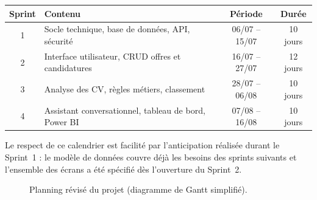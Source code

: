 \documentclass[11pt,a4paper]{article}
\begin{document}
\begin{center}
\begin{tabular}{clcc}
  \toprule
  \textbf{Sprint} & \textbf{Contenu} & \textbf{Période} & \textbf{Durée} \\
  \midrule
  1 & Socle technique, base de données, API, sécurité & 06/07 -- 15/07 & 10 jours \\
  2 & Interface utilisateur, CRUD offres et candidatures & 16/07 -- 27/07 & 12 jours \\
  3 & Analyse des CV, règles métiers, classement & 28/07 -- 06/08 & 10 jours \\
  4 & Assistant conversationnel, tableau de bord, Power BI & 07/08 -- 16/08 & 10 jours \\
  \bottomrule
\end{tabular}
\end{center}

\vspace{2mm}
\noindent Le respect de ce calendrier est facilité par l'anticipation réalisée durant le Sprint~1 : le modèle de données couvre déjà les besoins des sprints suivants et l'ensemble des écrans a été spécifié dès l'ouverture du Sprint~2.

\begin{figure}[H]
  \centering
  \caption{Planning révisé du projet (diagramme de Gantt simplifié).}
  \label{fig:gantt}
\end{figure}
\end{document}
